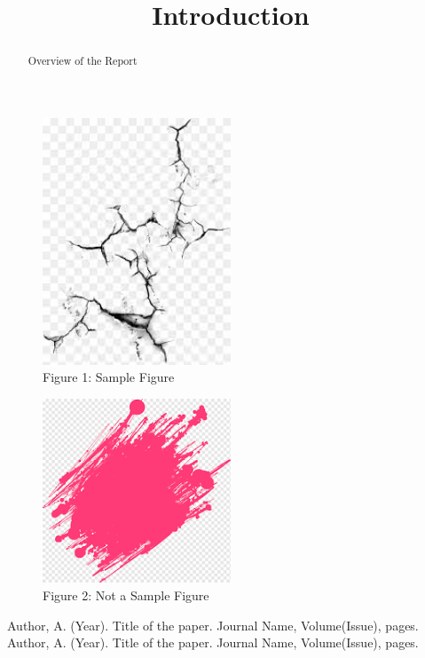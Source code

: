\documentclass{article}
\begin{document}
\newpage
\title{Introduction}
\begin{abstract}
Overview of the Report
\end{abstract}
\begin{figure}[h!]
\centering
\includegraphics[width=0.5\textwidth]{figure1.png}
\caption{Figure 1: Sample Figure}
\end{figure}
\begin{figure}[h!]
\centering
\includegraphics[width=0.5\textwidth]{figure2.png}
\caption{Figure 2: Not a Sample Figure}
\end{figure}
\begin{thebibliography}{100}
Author, A. (Year). Title of the paper. Journal Name, Volume(Issue), pages.
Author, A. (Year). Title of the paper. Journal Name, Volume(Issue), pages.
\end{thebibliography}
\end{document}
